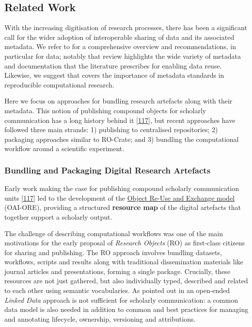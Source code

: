 {\hypertarget{relatedwork}{%
\subsection{Related Work}\label{relatedwork}}

With the increasing digitisation of research processes, there has been a
significant call for the wider adoption of interoperable sharing of data
and its associated metadata. We refer to
\cite{ch5-72} for a
comprehensive overview and recommendations, in particular for data;
notably that review highlights the wide variety of metadata and
documentation that the literature prescribes for enabling data reuse.
Likewise, we suggest
\cite{ch5-82} that
covers the importance of metadata standards in reproducible
computational research.

Here we focus on approaches for bundling research artefacts along with
their metadata. This notion of publishing compound objects for scholarly
communication has a long history behind it
\cite{Claerbout 1992}
\href{http://icl.utk.edu/ctwatch/quarterly/articles/2007/08/interoperability-for-the-discovery-use-and-re-use-of-units-of-scholarly-communication/}{{[}117{]}},
but recent approaches have followed three main strands: 1) publishing to
centralised repositories; 2) packaging approaches similar to RO-Crate;
and 3) bundling the computational workflow around a scientific
experiment.

\hypertarget{bundling-and-packaging-digital-research-artefacts}{%
\subsubsection{Bundling and Packaging Digital Research
Artefacts}\label{bundling-and-packaging-digital-research-artefacts}}

Early work making the case for publishing compound scholarly
communication units
\href{http://icl.utk.edu/ctwatch/quarterly/articles/2007/08/interoperability-for-the-discovery-use-and-re-use-of-units-of-scholarly-communication/}{{[}117{]}}
led to the development of the
\href{http://www.openarchives.org/ore/1.0/primer}{Object Re-Use and
Exchange model} (OAI-ORE), providing a structured \textbf{resource map}
of the digital artefacts that together support a scholarly output.

The challenge of describing computational workflows was one of the main
motivations for the early proposal of \emph{Research Objects} (RO)
\cite{Bechhofer 2013}
as first-class citizens for sharing and publishing. The RO approach
involves bundling datasets, workflows, scripts and results along with
traditional dissemination materials like journal articles and
presentations, forming a single package. Crucially, these resources are
not just gathered, but also individually typed, described and related to
each other using semantic vocabularies. As pointed out in
\cite{Bechhofer 2013} an
open-ended \emph{Linked Data} approach is not sufficient for scholarly
communication: a common data model is also needed in addition to common
and best practices for managing and annotating lifecycle, ownership,
versioning and attributions.

}
